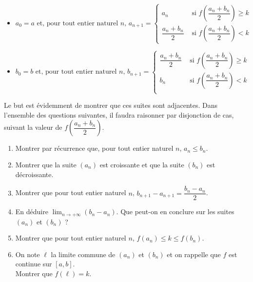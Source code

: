 \documentclass[11pt,fleqn, openany]{book} %
\begin{document}
\begin{exercise}[topic=cont03, subtitle={(Démontrer le théorème des valeurs intermédiaires)}]
\begin{itemize}
\item $ a_0 = a 
\text{ et, pour tout entier naturel }n,\, a_{n+1} = \left\{ \begin{array}{ll} a_n& \text{ si } f\left(\dfrac{a_n+b_n}{2}\right) \geqslant k \\ \dfrac{a_n +b_n}{2} &\text{ si } f\left(\dfrac{a_n+b_n}{2}\right) < k \end{array}\right.$
\vskip5pt
\item $ b_0 = b
\text{ et, pour tout entier naturel }n,\, b_{n+1} = \left\{ \begin{array}{ll} \dfrac{a_n +b_n}{2} & \text{ si } f\left(\dfrac{a_n+b_n}{2}\right) \geqslant k \\
b_n &\text{ si } f\left(\dfrac{a_n+b_n}{2}\right) < k \\  \end{array}\right.$
\end{itemize}

Le but est évidemment de montrer que ces suites sont adjacentes. Dans l'ensemble des questions suivantes, il faudra raisonner par disjonction de cas, suivant la valeur de $f\left(\dfrac{a_n+b_n}{2}\right)$.

\begin{enumerate}
\item Montrer par récurrence que, pour tout entier naturel $n$, $a_n \leqslant b_n$. 
\item Montrer que la suite $(a_n)$ est croissante et que la suite $(b_n)$ est décroissante.
\item Montrer que pour tout entier naturel $n$, $b_{n+1}-a_{n+1}=\dfrac{b_n-a_n}{2}$.
\item En déduire $\displaystyle\lim_{n \to + \infty}(b_n-a_n)$. Que peut-on en conclure sur les suites $(a_n)$ et $(b_n)$ ?
\item Montrer que pour tout entier naturel $n$, $f(a_n) \leqslant k \leqslant f(b_n)$.
\item On note $\ell$ la limite commune de $(a_n)$ et $(b_n)$ et on rappelle que $f$ est continue sur $[a,b]$.\\ Montrer que $f(\ell)=k$.
\end{enumerate}

\end{exercise}
\end{document}
